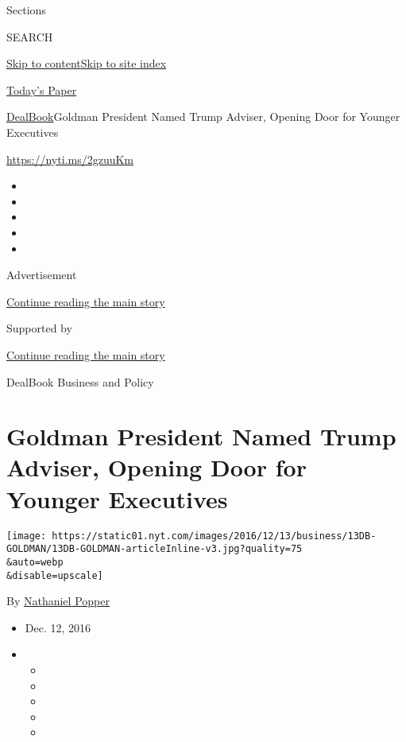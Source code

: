 Sections

SEARCH

\protect\hyperlink{site-content}{Skip to
content}\protect\hyperlink{site-index}{Skip to site index}

\href{https://myaccount.nytimes.com/auth/login?response_type=cookie\&client_id=vi}{}

\href{https://www.nytimes.com/section/todayspaper}{Today's Paper}

\href{/section/business/dealbook}{DealBook}\textbar{}Goldman President
Named Trump Adviser, Opening Door for Younger Executives

\url{https://nyti.ms/2gzuuKm}

\begin{itemize}
\item
\item
\item
\item
\item
\end{itemize}

Advertisement

\protect\hyperlink{after-top}{Continue reading the main story}

Supported by

\protect\hyperlink{after-sponsor}{Continue reading the main story}

DealBook Business and Policy

\hypertarget{goldman-president-named-trump-adviser-opening-door-for-younger-executives}{%
\section{Goldman President Named Trump Adviser, Opening Door for Younger
Executives}\label{goldman-president-named-trump-adviser-opening-door-for-younger-executives}}

\texttt{[image: https://static01.nyt.com/images/2016/12/13/business/13DB-GOLDMAN/13DB-GOLDMAN-articleInline-v3.jpg?quality=75\\\&auto=webp\\\&disable=upscale]}

By \href{http://www.nytimes.com/by/nathaniel-popper}{Nathaniel Popper}

\begin{itemize}
\item
  Dec. 12, 2016
\item
  \begin{itemize}
  \item
  \item
  \item
  \item
  \item
  \end{itemize}
\end{itemize}

